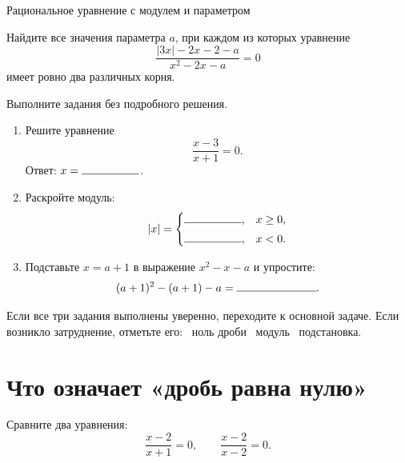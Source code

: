 \worksheettitle
  {Рациональное уравнение с модулем и параметром}


\begin{problembox}
  Найдите все значения параметра \(a\), при каждом из которых уравнение
  \[
    \frac{|3x|-2x-2-a}{x^2-2x-a}=0
  \]
  имеет ровно два различных корня.
\end{problembox}

\begin{checkpointbox}
  Выполните задания без подробного решения.
  \begin{enumerate}[label=\textbf{\arabic*.},itemsep=0.45em]
    \item Решите уравнение
      \[
        \frac{x-3}{x+1}=0.
      \]
      Ответ: \(x=\answerblank[18mm]\).

    \item Раскройте модуль:
      \[
        |x|=
        \begin{cases}
          \answerblank[18mm],&x\ge0,\\[1mm]
          \answerblank[18mm],&x<0.
        \end{cases}
      \]

    \item Подставьте \(x=a+1\) в выражение \(x^2-x-a\) и упростите:
      \[
        (a+1)^2-(a+1)-a=\answerblank[25mm].
      \]
  \end{enumerate}
\end{checkpointbox}

\begin{reflectionbox}
  Если все три задания выполнены уверенно, переходите к основной задаче.
  Если возникло затруднение, отметьте его:
  \choicebox\ ноль дроби\qquad
  \choicebox\ модуль\qquad
  \choicebox\ подстановка.
\end{reflectionbox}



\section{Что означает «дробь равна нулю»}

Сравните два уравнения:
\[
  \frac{x-2}{x+1}=0,
  \qquad
  \frac{x-2}{x-2}=0.
\]

